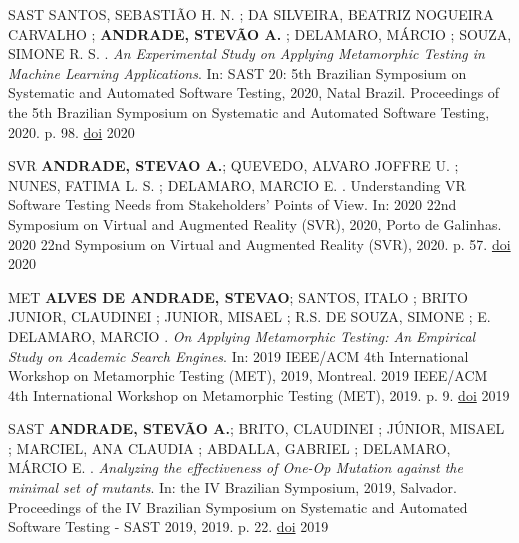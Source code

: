 \begin{cvhonors}

  \cvhonor
    {SAST \faFileTextO} %
    {SANTOS, SEBASTIÃO H. N. ; DA SILVEIRA, BEATRIZ NOGUEIRA CARVALHO ; \textbf{ANDRADE, STEVÃO A.} ; DELAMARO, MÁRCIO ; SOUZA, SIMONE R. S. . \textit{An Experimental Study on Applying Metamorphic Testing in Machine Learning Applications}. In: SAST 20: 5th Brazilian Symposium on Systematic and Automated Software Testing, 2020, Natal Brazil. Proceedings of the 5th Brazilian Symposium on Systematic and Automated Software Testing, 2020. p. 98.} %
    {\href{http://dx.doi.org/10.13140/RG.2.2.36132.68485}{doi}} %
    {2020} %

  \cvhonor
    {SVR \faFileTextO} %
    {\textbf{ANDRADE, STEVAO A.}; QUEVEDO, ALVARO JOFFRE U. ; NUNES, FATIMA L. S. ; DELAMARO, MARCIO E. . Understanding VR Software Testing Needs from Stakeholders' Points of View. In: 2020 22nd Symposium on Virtual and Augmented Reality (SVR), 2020, Porto de Galinhas. 2020 22nd Symposium on Virtual and Augmented Reality (SVR), 2020. p. 57.} %
    {\href{http://dx.doi.org/10.1145/3425174.3425226}{doi}} %
    {2020} %
    
  \cvhonor
    {MET \faFileTextO} %
    {\textbf{ALVES DE ANDRADE, STEVAO}; SANTOS, ITALO ; BRITO JUNIOR, CLAUDINEI ; JUNIOR, MISAEL ; R.S. DE SOUZA, SIMONE ; E. DELAMARO, MARCIO . \textit{On Applying Metamorphic Testing: An Empirical Study on Academic Search Engines}. In: 2019 IEEE/ACM 4th International Workshop on Metamorphic Testing (MET), 2019, Montreal. 2019 IEEE/ACM 4th International Workshop on Metamorphic Testing (MET), 2019. p. 9.} %
    {\href{http://dx.doi.org/10.1109/SVR51698.2020.00024}{doi}} %
    {2019} %
    
  \cvhonor
    {SAST \faFileTextO} %
    {\textbf{ANDRADE, STEVÃO A.}; BRITO, CLAUDINEI ; JÚNIOR, MISAEL ; MARCIEL, ANA CLAUDIA ; ABDALLA, GABRIEL ; DELAMARO, MÁRCIO E. . \textit{Analyzing the effectiveness of One-Op Mutation against the minimal set of mutants}. In: the IV Brazilian Symposium, 2019, Salvador. Proceedings of the IV Brazilian Symposium on Systematic and Automated Software Testing - SAST 2019, 2019. p. 22.} %
    {\href{http://dx.doi.org/10.1145/3356317.3356321}{doi}} %
    {2019} %
    

\end{cvhonors}
